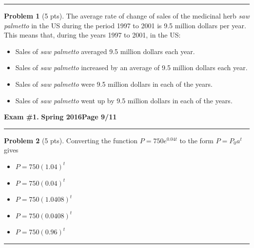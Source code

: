 \documentclass[12pt]{article}
\makeatletter
\theoremstyle{definition}
\newtheorem{problem}{Problem}
\newcommand*{\radiobutton}{%
  \@ifstar{\@radiobutton0}{\@radiobutton1}%
}
\newcommand*{\@radiobutton}[1]{%
  \begin{tikzpicture}
    \pgfmathsetlengthmacro\radius{height("X")/2}
    \draw[radius=\radius] circle;
    \ifcase#1 \fill[radius=.6*\radius] circle;\fi
  \end{tikzpicture}%
}
\makeatother
\begin{document}
\vspace{6cm}
\hrule

\begin{problem}[5 pts]
The average rate of change of sales of the medicinal herb \textit{saw palmetto} in the US during the period 1997 to 2001 is 9.5 million dollars per year. This means that, during the years 1997 to 2001, in the US:
\begin{itemize}
\item[\radiobutton] Sales of \textit{saw palmetto} averaged 9.5 million dollars each year.
\item[\radiobutton] Sales of \textit{saw palmetto} increased by an average of 9.5 million dollars each year.
\item[\radiobutton] Sales of \textit{saw palmetto} were 9.5 million dollars in each of the years.
\item[\radiobutton] Sales of \textit{saw palmetto} went up by 9.5 million dollars in each of the years.
\end{itemize}
\end{problem}
\newpage

\hfill{\large\bf Exam \#1.}\hfill{\large\bf
  Spring 2016}\hfill{\large\bf Page 9/11}\hrule

\begin{problem}[5 pts]
Converting the function $P = 750e^{0.04t}$ to the form $P = P_0a^t$ gives
\begin{itemize}
\item[\radiobutton] $P = 750 (1.04)^t$
\item[\radiobutton] $P = 750 (0.04)^t$
\item[\radiobutton] $P = 750 (1.0408)^t$
\item[\radiobutton] $P = 750 (0.0408)^t$
\item[\radiobutton] $P = 750 (0.96)^t$
\end{itemize}
\end{problem}

\vspace{6cm}
\hrule
\end{document}

